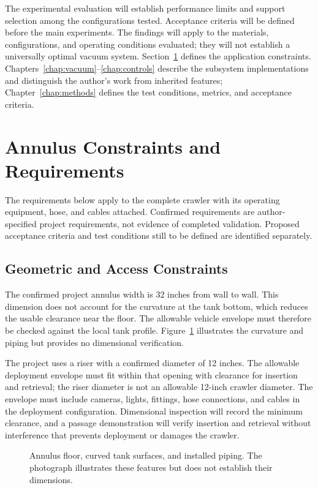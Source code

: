 The experimental evaluation will establish performance limits and support selection among the configurations tested. Acceptance criteria will be defined before the main experiments. The findings will apply to the materials, configurations, and operating conditions evaluated; they will not establish a universally optimal vacuum system. Section~\ref{sec:dst-constraints} defines the application constraints. Chapters~\ref{chap:vacuum}--\ref{chap:controls} describe the subsystem implementations and distinguish the author's work from inherited features; Chapter~\ref{chap:methods} defines the test conditions, metrics, and acceptance criteria.

\section{Annulus Constraints and Requirements}
\label{sec:dst-constraints}

The requirements below apply to the complete crawler with its operating equipment, hose, and cables attached. Confirmed requirements are author-specified project requirements, not evidence of completed validation. Proposed acceptance criteria and test conditions still to be defined are identified separately.

\subsection{Geometric and Access Constraints}
\label{sec:annulus-geometry}
The confirmed project annulus width is 32 inches from wall to wall. This dimension does not account for the curvature at the tank bottom, which reduces the usable clearance near the floor. The allowable vehicle envelope must therefore be checked against the local tank profile. Figure~\ref{fig:annulus-clearance} illustrates the curvature and piping but provides no dimensional verification.

The project uses a riser with a confirmed diameter of 12 inches. The allowable deployment envelope must fit within that opening with clearance for insertion and retrieval; the riser diameter is not an allowable 12-inch crawler diameter. The envelope must include cameras, lights, fittings, hose connections, and cables in the deployment configuration. Dimensional inspection will record the minimum clearance, and a passage demonstration will verify insertion and retrieval without interference that prevents deployment or damages the crawler.

\begin{figure}[H]
\centering
{}
\caption{Annulus floor, curved tank surfaces, and installed piping. The photograph illustrates these features but does not establish their dimensions.}
\label{fig:annulus-clearance}
\end{figure}

